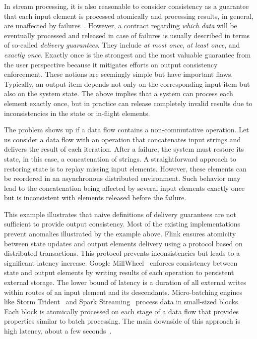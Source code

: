 In stream processing, it is also reasonable to consider consistency as a guarantee that each input element is processed atomically and processing results, in general, are unaffected by failures~\cite{Zaharia:2012:DSE:2342763.2342773}. However, a contract regarding {\em which data} will be eventually processed and released in case of failures is usually described in terms of so-called {\em delivery guarantees}. They include {\em at most once}, {\em at least once}, and {\em exactly once}. Exactly once is the strongest and the most valuable guarantee from the user perspective because it mitigates efforts on output consistency enforcement. 
These notions are seemingly simple but have important flaws. Typically, an output item depends not only on the corresponding input item but also on the system state. 
The above implies that a system can process each element exactly once, but in practice can release completely invalid results due to inconsistencies in the state or in-flight elements.

The problem shows up if a data flow contains a non-commutative operation. Let us consider a data flow with an operation that concatenates input strings and delivers the result of each iteration. 
After a failure, the system must restore its state, in this case, a concatenation of strings. 
A straightforward approach to restoring state is to replay missing input elements. 
However, these elements can be reordered in an asynchronous distributed environment. 
Such behavior may lead to the concatenation being affected by several input elements exactly once but is inconsistent with elements released before the failure.

This example illustrates that naive definitions of delivery guarantees are not sufficient to provide output consistency. 
Most of the existing implementations prevent anomalies illustrated by the example above. Flink ensures atomicity between state updates and output elements delivery using a protocol based on distributed transactions. This protocol prevents inconsistencies but leads to a significant latency increase. 
Google MillWheel~\cite{Akidau:2013:MFS:2536222.2536229} enforces consistency between state and output elements by writing results of each operation to persistent external storage. 
The lower bound of latency is a duration of all external writes within routes of an input element and its descendants. 
Micro-batching engines like Storm Trident~\cite{apache:storm:trident} and Spark Streaming~\cite{Zaharia:2012:DSE:2342763.2342773} process data in small-sized blocks. 
Each block is atomically processed on each stage of a data flow that provides properties similar to batch processing.
 The main downside of this approach is high latency, about a few seconds~\cite{7530084, 7474816}.

